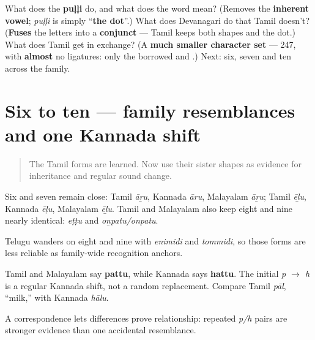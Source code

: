 \begin{tcolorbox}[breakable,colback=teal!4,colframe=teal!35!black,title={Before you move on}]
What does the \textbf{puḷḷi} do, and what does the word mean? (Removes the \textbf{inherent vowel}; \emph{puḷḷi} is simply \textquotedblleft{}\textbf{the dot}\textquotedblright{}.) What does Devanagari do that Tamil doesn't? (\textbf{Fuses} the letters into a \textbf{conjunct} — Tamil keeps both shapes and the dot.) What does Tamil get in exchange? (A \textbf{much smaller character set} — 247, with \textbf{almost} no ligatures: only the borrowed  and .) Next: six, seven and ten across the family.
\end{tcolorbox}
\section[\texorpdfstring{\ta{ஆறு} \ta{ஏழு} \ta{பத்து} (āṟu ēḻu pattu)}{ஆறு ஏழு பத்து (āṟu ēḻu pattu)}]{Six to ten — family resemblances and one Kannada shift}

\label{lesson:TA-C07-numbers-6-10-family}



\begin{quote}
The Tamil forms are learned. Now use their sister shapes as evidence for inheritance and regular sound change.
\end{quote}

\begin{cousinweb}
Six and seven remain close: Tamil \emph{āṟu}, Kannada \emph{āru}, Malayalam \emph{āṟu}; Tamil \emph{ēḻu}, Kannada \emph{ēḷu}, Malayalam \emph{ēḻu}. Tamil and Malayalam also keep eight and nine nearly identical: \emph{eṭṭu} and \emph{oṉpatu/onpatu}.

Telugu wanders on eight and nine with \emph{enimidi} and \emph{tommidi}, so those forms are less reliable as family-wide recognition anchors.
\end{cousinweb}

\begin{cousinweb}
Tamil and Malayalam say \textbf{pattu}, while Kannada says \textbf{hattu}. The initial \emph{p $\to$ h} is a regular Kannada shift, not a random replacement. Compare Tamil \emph{pāl}, \textquotedblleft{}milk,\textquotedblright{} with Kannada \emph{hālu}.

A correspondence lets differences prove relationship: repeated \emph{p/h} pairs are stronger evidence than one accidental resemblance.
\end{cousinweb}


